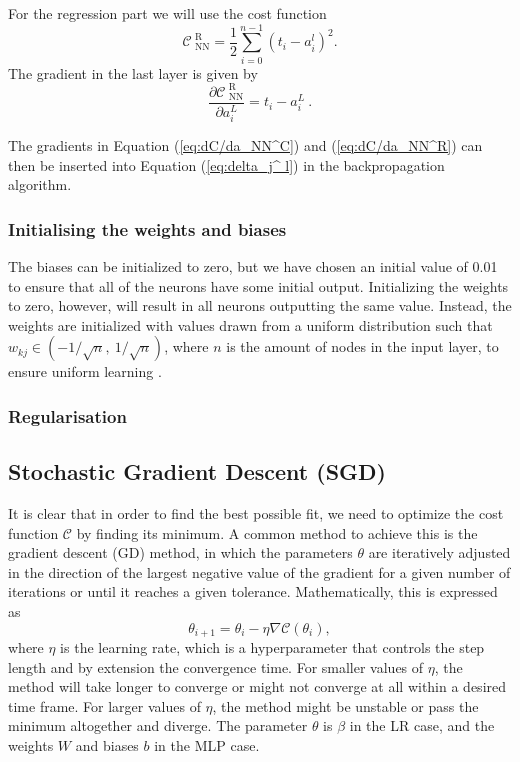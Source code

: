 \documentclass[a4paper, 11pt, twocolumn]{article}
\begin{document}
For the regression part we will use the cost function 
\begin{equation}
\mathcal{C}_\text{ NN}^\text{ R} = \frac{1}{2}\sum_{i=0}^{n-1}(t_i-a_i^l)^2.
\end{equation}
The gradient in the last layer is given by 
\begin{equation}
	\frac{\partial \mathcal{C}_\text{ NN}^\text{ R}}{\partial a_i^L}=t_i -a_i^L\ .
	\label{eq:dC/da_NN^R}
\end{equation}

The gradients in Equation (\ref{eq:dC/da_NN^C}) and (\ref{eq:dC/da_NN^R}) can then be inserted into Equation (\ref{eq:delta_j^ l}) in the backpropagation algorithm.
\subsubsection{Initialising  the weights and biases}
The biases can be initialized to zero, but we have chosen an initial value of 0.01
to ensure that all of the neurons have some initial output. Initializing the
weights to zero, however, will result in all neurons outputting the same value.
Instead, the  weights are initialized with values drawn from a uniform distribution
such that $w_{kj}\in (-1/\sqrt{n}, \ 1/\sqrt{n})$, where $n$ is the amount of
nodes in the input layer,  to ensure uniform learning \cite{ML_algo}.

\subsubsection{Regularisation}


\subsection{Stochastic Gradient Descent (SGD)}
\label{SGD}
It is clear that in order to find the best possible fit, we need to optimize the
cost function $\mathcal{C}$ by finding its minimum. A common method to achieve
this is the gradient descent (GD) method, in which the parameters $\theta$ are
iteratively adjusted in the direction of the largest negative value of the
gradient for a given number of iterations or until it reaches a given tolerance.
Mathematically, this is expressed as
\begin{equation}
\theta_{i+1} = \theta_i -\eta \nabla \mathcal{C}(\theta_i),
\end{equation}
where $\eta$ is the learning rate, which is a hyperparameter that controls the
step length and by extension the convergence time. For smaller values of $\eta$,
the method will take longer to converge or might not converge at all within a
desired time frame. For larger values of $\eta$, the method might be unstable or
pass the minimum altogether and diverge. The parameter $\theta$ is $\beta$ in
the LR case, and the weights $W$ and biases $b$ in the MLP case.
\end{document}
